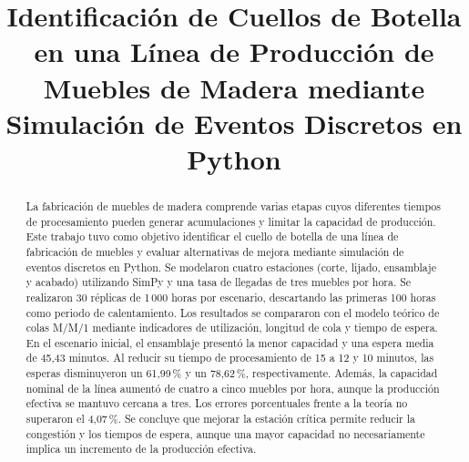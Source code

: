 \documentclass[conference,a4paper]{IEEEtran}
\begin{document}
\title{Identificación de Cuellos de Botella en una Línea de Producción de Muebles de Madera
mediante Simulación de Eventos Discretos en Python}

\author{
}

\maketitle

\begin{abstract}
La fabricación de muebles de madera comprende varias etapas cuyos diferentes tiempos de
procesamiento pueden generar acumulaciones y limitar la capacidad de producción. Este
trabajo tuvo como objetivo identificar el cuello de botella de una línea de fabricación de
muebles y evaluar alternativas de mejora mediante simulación de eventos discretos en
Python. Se modelaron cuatro estaciones (corte, lijado, ensamblaje y acabado) utilizando
SimPy y una tasa de llegadas de tres muebles por hora. Se realizaron 30 réplicas de
1\,000 horas por escenario, descartando las primeras 100 horas como periodo de
calentamiento. Los resultados se compararon con el modelo teórico de colas M/M/1 mediante
indicadores de utilización, longitud de cola y tiempo de espera. En el escenario inicial,
el ensamblaje presentó la menor capacidad y una espera media de 45,43 minutos. Al reducir
su tiempo de procesamiento de 15 a 12 y 10 minutos, las esperas disminuyeron un
61,99\,\% y un 78,62\,\%, respectivamente. Además, la capacidad nominal de la línea
aumentó de cuatro a cinco muebles por hora, aunque la producción efectiva se mantuvo
cercana a tres. Los errores porcentuales frente a la teoría no superaron el 4,07\,\%. Se
concluye que mejorar la estación crítica permite reducir la congestión y los tiempos de
espera, aunque una mayor capacidad no necesariamente implica un incremento de la
producción efectiva.
\end{abstract}
\end{document}
